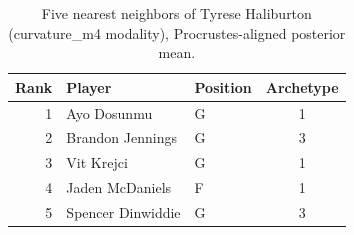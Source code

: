 \begin{table}[htbp]
  \centering\small
  \begin{tabular}{rllc}
    \toprule
    Rank & Player & Position & Archetype \\
    \midrule
    1 & Ayo Dosunmu & G & 1 \\
    2 & Brandon Jennings & G & 3 \\
    3 & Vit Krejci & G & 1 \\
    4 & Jaden McDaniels & F & 1 \\
    5 & Spencer Dinwiddie & G & 3 \\
    \bottomrule
  \end{tabular}
  \caption{Five nearest neighbors of Tyrese Haliburton (curvature_m4 modality), Procrustes-aligned posterior mean.}
  \label{tab:Tyrese_Haliburton_neighbors_curvature_m4}
\end{table}

